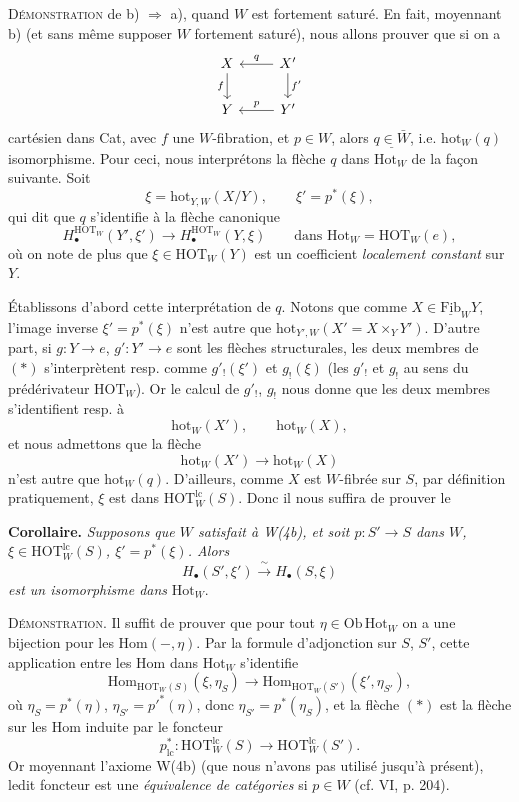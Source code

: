 \documentclass[11pt]{article}
\newcommand{\printedpage}[1]{\marginpar{\footnotesize p.~#1}}
\newcommand{\msp}[1]{\marginpar{\footnotesize [#1]}}
\newcommand{\Hot}{\mathrm{Hot}}
\newcommand{\hot}{\mathrm{hot}}
\newcommand{\HOT}{\mathrm{HOT}}
\newcommand{\Hom}{\mathrm{Hom}}
\newcommand{\Fib}{\mathrm{Fib}}
\begin{document}
\textsc{Démonstration} de b) $\Longrightarrow$ a), quand $W$ est fortement saturé. En fait, moyennant b) (et sans même supposer $W$ fortement saturé), nous allons prouver que si on a
\[
\begin{tikzcd}
X & X' \arrow[l,"q"'] \arrow[d,"f'"] \\
Y \arrow[from=u,"f"'] & Y' \arrow[l,"p"']
\end{tikzcd}
\]
cartésien dans Cat, avec
\msp{page 55}
$f$ une $W$-fibration, et $p \in W$, alors $\underline{q \in \bar{W}}$, i.e. $\hot_W(q)$ isomorphisme. Pour ceci, nous interprétons la flèche $q$ dans $\Hot_W$ de la façon suivante. Soit
\[
\xi = \hot_{Y,W}(X/Y), \qquad \xi' = p^*(\xi),
\]
\printedpage{41}
qui dit que $q$ s'identifie à la flèche canonique
\[
H_\bullet^{\HOT_W}(Y',\xi') \longrightarrow H_\bullet^{\HOT_W}(Y,\xi) \qquad \text{dans } \Hot_W = \HOT_W(e), \tag*{$(*)$}
\]
où on note de plus que $\xi \in \HOT_W(Y)$ est un coefficient \textit{localement constant} sur $Y$.

Établissons d'abord cette interprétation de $q$. Notons que comme $X \in \underline{\Fib}_W Y$, l'image inverse $\xi' = p^*(\xi)$ n'est autre que $\hot_{Y',W}(X' = X \times_Y Y')$. D'autre part, si $g : Y \longrightarrow e$, $g' : Y' \longrightarrow e$ sont les flèches structurales, les deux membres de $(*)$ s'interprètent resp. comme $g'_!(\xi')$ et $g_!(\xi)$ (les $g'_!$ et $g_!$ au sens du prédérivateur $\HOT_W$). Or le calcul de $g'_!$, $g_!$ nous donne que les deux membres s'identifient resp. à
\[
\hot_W(X'), \qquad \hot_W(X),
\]
et nous admettons que la flèche
\[
\hot_W(X') \longrightarrow \hot_W(X)
\]
n'est autre que $\hot_W(q)$. D'ailleurs, comme $X$ est $W$-fibrée sur $S$, par définition pratiquement, $\xi$ est dans $\HOT^{\mathrm{lc}}_W(S)$. Donc il nous suffira de prouver le

\msp{page 56}

\textbf{Corollaire.} \textit{Supposons que $W$ satisfait à W(4b), et soit $p : S' \longrightarrow S$ dans $W$, $\xi \in \HOT^{\mathrm{lc}}_W(S)$, $\xi' = p^*(\xi)$. Alors}
\[
H_\bullet(S',\xi') \xrightarrow{\ \sim\ } H_\bullet(S,\xi)
\]
\textit{est un isomorphisme dans} $\Hot_W$.

\textsc{Démonstration}. Il suffit de prouver que pour tout $\eta \in \mathrm{Ob}\,\Hot_W$ on a une bijection pour les $\Hom(-,\eta)$. Par la formule d'adjonction sur $S$, $S'$, cette application entre les Hom dans $\Hot_W$ s'identifie
\[
\Hom_{\HOT_W(S)}(\xi,\eta_S) \longrightarrow \Hom_{\HOT_W(S')}(\xi',\eta_{S'}),
\]
où $\eta_S = p^*(\eta)$, $\eta_{S'} = p'^*(\eta)$, donc $\eta_{S'} = p^*(\eta_S)$, et la flèche $(*)$ est la flèche sur les Hom induite par le foncteur
\[
p^*_{\mathrm{lc}} : \HOT^{\mathrm{lc}}_W(S) \longrightarrow \HOT^{\mathrm{lc}}_W(S').
\]
Or moyennant l'axiome W(4b) (que nous n'avons pas utilisé jusqu'à présent), ledit foncteur est une \textit{équivalence de catégories} si $p \in W$ (cf. VI, p. 204).
\end{document}
